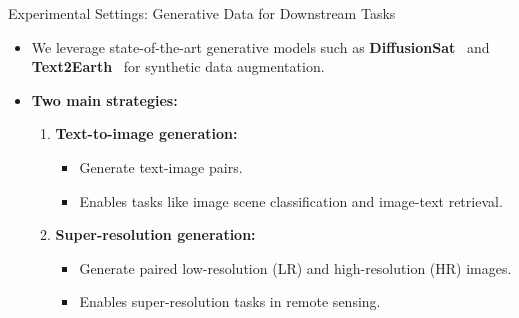   \begin{refsection}
    \begin{frame}{Experimental Settings: Generative Data for Downstream Tasks}
      \begin{itemize}
        \item We leverage state-of-the-art generative models such as \textbf{DiffusionSat}~\parencite{diffusionset2024} and \textbf{Text2Earth}~\parencite{text2earth2025} for synthetic data augmentation.
        \item \textbf{Two main strategies:}
        \begin{enumerate}
          \item \textbf{Text-to-image generation:}
            \begin{itemize}
              \item Generate text-image pairs.
              \item Enables tasks like image scene classification and image-text retrieval.
            \end{itemize}
          \item \textbf{Super-resolution generation:}
            \begin{itemize}
              \item Generate paired low-resolution (LR) and high-resolution (HR) images.
              \item Enables super-resolution tasks in remote sensing.
            \end{itemize}
        \end{enumerate}
      \end{itemize}
      \vspace{1em}
      \bottomleftrefs
    \end{frame}
    \end{refsection}

